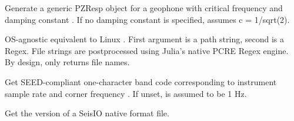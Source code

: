 \documentclass[letterpaper,11pt,english]{sphinxmanual}
\begin{document}
Generate a generic PZResp object for a geophone with critical frequency  and damping constant . If no damping constant is specified, assumes c = 1/sqrt(2).

\begin{fulllineitems}
\label{\detokenize{src/Appendices/function_list:find_regex}}
\end{fulllineitems}


OS-agnostic equivalent to Linux . First argument is a path string, second is a Regex. File strings are postprocessed using Julia’s native PCRE Regex engine. By design,  only returns file names.

\begin{fulllineitems}
\label{\detokenize{src/Appendices/function_list:getbandcode}}
\end{fulllineitems}


Get SEED-compliant one-character band code corresponding to instrument sample rate  and corner frequency . If unset,  is assumed to be 1 Hz.

\begin{fulllineitems}
\label{\detokenize{src/Appendices/function_list:get_file_ver}}
\end{fulllineitems}


Get the version of a SeisIO native format file.

\begin{fulllineitems}
\label{\detokenize{src/Appendices/function_list:get_seis_channels}}
\end{fulllineitems}
\end{document}
